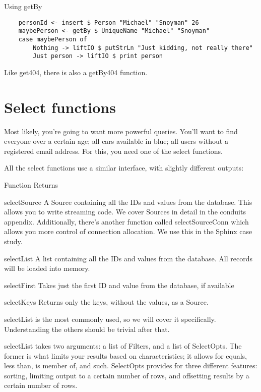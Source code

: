 Using getBy %

\begin{lstlisting}
    personId <- insert $ Person "Michael" "Snoyman" 26
    maybePerson <- getBy $ UniqueName "Michael" "Snoyman"
    case maybePerson of
        Nothing -> liftIO $ putStrLn "Just kidding, not really there"
        Just person -> liftIO $ print person
\end{lstlisting}

Like get404, there is also a getBy404 function.

\section{Select functions}

Most likely, you're going to want more powerful queries. You'll want to find everyone over a certain age; all cars available in blue; all users without a registered email address. For this, you need one of the select functions.

All the select functions use a similar interface, with slightly different outputs:


Function	Returns

selectSource	A Source containing all the IDs and values from the database. This allows you to write streaming code.
                We cover Sources in detail in the conduits appendix. Additionally, there's another function called selectSourceConn which allows you more control of connection allocation. We use this in the Sphinx case study.

selectList	A list containing all the IDs and values from the database. All records will be loaded into memory.

selectFirst	Takes just the first ID and value from the database, if available

selectKeys	Returns only the keys, without the values, as a Source.

selectList is the most commonly used, so we will cover it specifically. Understanding the others should be trivial after that.

selectList takes two arguments: a list of Filters, and a list of SelectOpts. The former is what limits your results based on characteristics; it allows for equals, less than, is member of, and such. SelectOpts provides for three different features: sorting, limiting output to a certain number of rows, and offsetting results by a certain number of rows.

